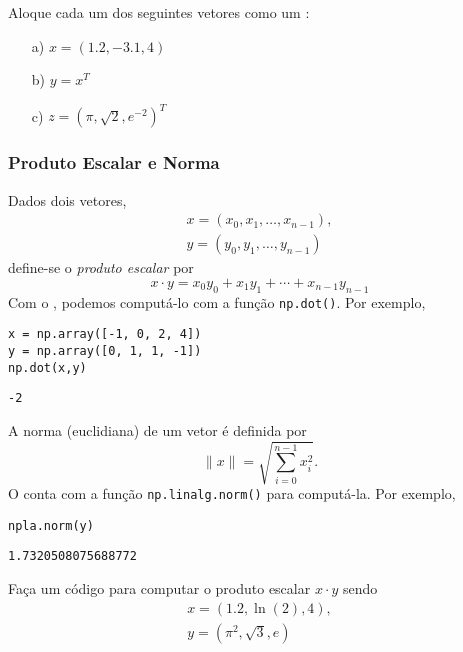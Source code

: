 \documentclass[a4paper,10pt,twoside]{article}
\begin{document}
\begin{exr}
  Aloque cada um dos seguintes vetores como um {\PYTHONnumpyDOTarray}:
  \begin{enumerate}
  \item[a)] $x = (1.2, -3.1, 4)$
  \item[b)] $y = x^T$
  \item[c)] $z = (\pi, \sqrt{2}, e^{-2})^T$
  \end{enumerate}
\end{exr}

\subsubsection{Produto Escalar e Norma}

Dados dois vetores,
\begin{gather}
  x = (x_0, x_1, \dotsc, x_{n-1}),\\
  y = (y_0, y_1, \dotsc, y_{n-1})
\end{gather}
define-se o \emph{produto escalar} por
\begin{equation}
  x\cdot y = x_0y_0 + x_1y_1 + \cdots + x_{n-1}y_{n-1}
\end{equation}
Com o {\numpy}, podemos computá-lo com a função \texttt{np.dot()}. Por exemplo,

\begin{lstlisting}
x = np.array([-1, 0, 2, 4])
y = np.array([0, 1, 1, -1])
np.dot(x,y)
\end{lstlisting}

\begin{verbatim}
-2
\end{verbatim}

A norma (euclidiana) de um vetor é definida por
\begin{equation}
  \|x\| = \sqrt{\sum_{i=0}^{n-1} x_i^2}.
\end{equation}
O {\numpy} conta com a função \texttt{np.linalg.norm()} para computá-la. Por exemplo,

\begin{lstlisting}
npla.norm(y)
\end{lstlisting}

\begin{verbatim}
1.7320508075688772
\end{verbatim}

\begin{exr}
  Faça um código para computar o produto escalar $x\cdot y$ sendo
  \begin{gather}
    x = (1.2, \ln(2), 4),\\
    y = (\pi^2, \sqrt{3}, e)
  \end{gather}
\end{exr}
\end{document}
